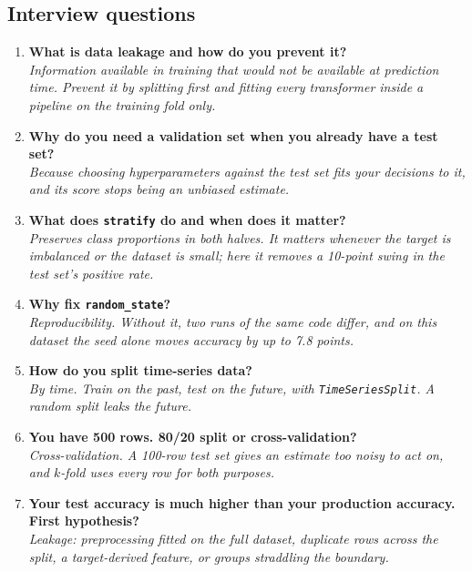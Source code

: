 \documentclass[11pt,a4paper]{article}
\begin{document}
\subsection*{Interview questions}

\begin{enumerate}\itemsep4pt
  \item \textbf{What is data leakage and how do you prevent it?}\\
        \emph{Information available in training that would not be available at prediction
        time. Prevent it by splitting first and fitting every transformer inside a pipeline
        on the training fold only.}
  \item \textbf{Why do you need a validation set when you already have a test set?}\\
        \emph{Because choosing hyperparameters against the test set fits your decisions to
        it, and its score stops being an unbiased estimate.}
  \item \textbf{What does \lstinline|stratify| do and when does it matter?}\\
        \emph{Preserves class proportions in both halves. It matters whenever the target is
        imbalanced or the dataset is small; here it removes a 10-point swing in the test
        set's positive rate.}
  \item \textbf{Why fix \lstinline|random_state|?}\\
        \emph{Reproducibility. Without it, two runs of the same code differ, and on this
        dataset the seed alone moves accuracy by up to 7.8 points.}
  \item \textbf{How do you split time-series data?}\\
        \emph{By time. Train on the past, test on the future, with
        \lstinline|TimeSeriesSplit|. A random split leaks the future.}
  \item \textbf{You have 500 rows. 80/20 split or cross-validation?}\\
        \emph{Cross-validation. A 100-row test set gives an estimate too noisy to act on,
        and $k$-fold uses every row for both purposes.}
  \item \textbf{Your test accuracy is much higher than your production accuracy. First
        hypothesis?}\\
        \emph{Leakage: preprocessing fitted on the full dataset, duplicate rows across the
        split, a target-derived feature, or groups straddling the boundary.}
\end{enumerate}
\end{document}
